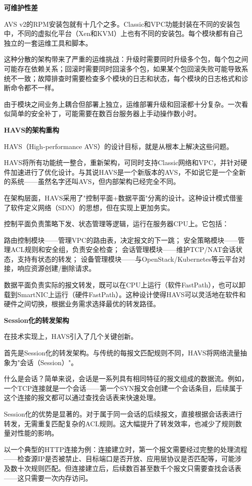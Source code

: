 \textbf{可维护性差}

AVS v2的RPM安装包就有十几个之多。Classic和VPC功能封装在不同的安装包中，不同的虚拟化平台（Xen和KVM）上也有不同的安装包。每个模块都有自己独立的一套运维工具和脚本。

这种分散的架构带来了严重的运维挑战：升级时需要同时升级多个包，每个包之间可能存在依赖关系；回滚时需要同时回滚多个包，如果某个包回滚失败可能导致系统不一致；故障排查时需要检查多个模块的日志和状态，每个模块的日志格式和诊断命令都不一样。

由于模块之间业务上耦合但部署上独立，运维部署升级和回滚都十分复杂。一次看似简单的安全补丁，可能需要在数百台服务器上手动操作数小时。

\textbf{HAVS的架构重构}

HAVS（High-performance AVS）的设计目标，就是从根本上解决这些问题。

HAVS将所有功能统一整合，重新架构，可同时支持Classic网络和VPC，并针对硬件加速进行了优化设计。与其说HAVS是一个新版本的AVS，不如说它是一个全新的系统——虽然名字还叫AVS，但内部架构已经完全不同。

在架构层面，HAVS采用了"控制平面+数据平面"分离的设计。这种设计模式借鉴了软件定义网络（SDN）的思想，但在实现上更加务实。

控制平面负责策略下发、状态管理等逻辑，运行在服务器CPU上。它包括：

路由控制模块——管理VPC的路由表，决定报文的下一跳；
安全策略模块——管理ACL规则和安全组，负责安全检查；
会话管理模块——维护TCP/NAT会话状态，支持有状态的转发；
设备管理模块——与OpenStack/Kubernetes等云平台对接，响应资源创建/删除请求。

数据平面负责实际的报文转发，既可以在CPU上运行（软件FastPath），也可以卸载到SmartNIC上运行（硬件FastPath）。这种设计使得HAVS可以灵活地在软件和硬件之间切换，根据业务需求选择最优的转发路径。

\textbf{Session化的转发架构}

在技术实现上，HAVS引入了几个关键创新。

首先是Session化的转发架构。与传统的每报文匹配规则不同，HAVS将网络流量抽象为"会话（Session）"。

什么是会话？简单来说，会话是一系列具有相同特征的报文组成的数据流。例如，一个TCP连接就是一个会话——第一个SYN报文会创建一个会话条目，后续属于这个连接的报文都可以通过查找会话表来快速处理。

Session化的优势是显著的。对于属于同一会话的后续报文，直接根据会话表进行转发，无需重复匹配复杂的ACL规则。这大幅提升了转发效率，也减少了规则数量对性能的影响。

以一个典型的HTTP连接为例：连接建立时，第一个报文需要经过完整的处理流程——检查源IP是否被禁止、目标端口是否开放、应用层协议是否匹配等，可能涉及数十次规则匹配。但连接建立后，后续数百甚至数千个报文只需要查找会话表——这只需要一次内存访问。

